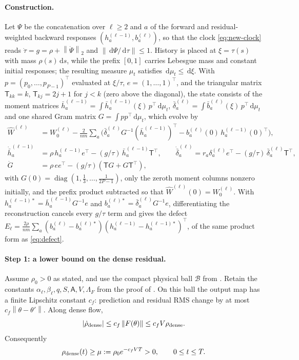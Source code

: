 \documentclass[11pt]{article}
\theoremstyle{definition}
\theoremstyle{remark}
\newcommand{\norm}[1]{\left\lVert #1\right\rVert}
\newcommand{\dd}{\,\mathrm{d}}
\newcommand{\diag}{\operatorname{diag}}
\begin{document}
\paragraph{Construction.}
Let $\Psi$ be the concatenation over $\ell\ge2$ and $a$ of the forward and
residual-weighted backward responses $(h^{(\ell-1)}_a,b^{(\ell)}_a)$, so that the
clock \eqref{eq:new-clock} reads $\dot\tau=g=\rho+\norm{\dot\Psi}_2$ and
$\norm{\dd\Psi/\dd\tau}\le1$.  History is placed at $\xi=\tau(s)$ with mass
$\rho(s)\dd s$, while the prefix $[0,1]$ carries Lebesgue mass and constant
initial responses; the resulting measure $\mu_t$ satisfies $\dd\mu_t\le\dd\xi$.
With $p=(p_0,\ldots,p_{P-1})^\top$ evaluated at $\xi/\tau$, $e=(1,\ldots,1)^\top$,
and the triangular matrix $\mathsf T_{kk}=k$, $\mathsf T_{kj}=2j+1$ for $j<k$
(zero above the diagonal), the state consists of the moment matrices
$\bar h^{(\ell-1)}_a=\int\bar h^{(\ell-1)}_a(\xi)\,p^\top\dd\mu_t$,
$\bar\delta^{(\ell)}_a=\int\bar b^{(\ell)}_a(\xi)\,p^\top\dd\mu_t$ and one shared
Gram matrix $G=\int pp^\top\dd\mu_t$, which evolve by
\begin{align}
 \widehat W^{(\ell)}&=W_0^{(\ell)}-\frac{2}{nm}\sum_a
 \bigl(\bar\delta^{(\ell)}_aG^{-1}(\bar h^{(\ell-1)}_a)^\top
 -b^{(\ell)}_a(0)\,h^{(\ell-1)}_a(0)^\top\bigr),\nonumber\\
 \dot{\bar h}^{(\ell-1)}_a&=\rho\,h^{(\ell-1)}_ae^\top-(g/\tau)\,\bar h^{(\ell-1)}_a\mathsf T^\top,
 \qquad
 \dot{\bar\delta}^{(\ell)}_a=r_a\delta_a^{(\ell)}e^\top-(g/\tau)\,\bar\delta^{(\ell)}_a\mathsf T^\top,
 \nonumber\\
 \dot G&=\rho\,ee^\top-(g/\tau)(\mathsf TG+G\mathsf T^\top),     \label{eq:new-ode}
\end{align}
with $G(0)=\diag(1,\tfrac13,\ldots,\tfrac1{2P-1})$, only the zeroth moment
columns nonzero initially, and the prefix product subtracted so that
$\widehat W^{(\ell)}(0)=W_0^{(\ell)}$.  With $h^{(\ell-1)*}_a=\bar h^{(\ell-1)}_aG^{-1}e$
and $b^{(\ell)*}_a=\bar\delta^{(\ell)}_aG^{-1}e$, differentiating the
reconstruction cancels every $g/\tau$ term and gives the defect
$E_\ell=\frac{2\rho}{nm}\sum_a(b^{(\ell)}_a-b^{(\ell)*}_a)(h^{(\ell-1)}_a-h^{(\ell-1)*}_a)^\top$,
of the same product form as \eqref{eq:defect}.

\paragraph{Step 1: a lower bound on the dense residual.}
Assume $\rho_0>0$ as stated, and use the compact physical ball $\mathcal B$ from
.  Retain the constants
$\alpha_\ell,\beta_\ell,q,S,\mathsf A,V,\Lambda_F$ from the proof of .  On
this ball the output map has a finite Lipschitz constant $c_f$: prediction and
residual RMS change by at most $c_f\norm{\theta-\theta'}$.  Along dense flow,
\[
 |\dot\rho_{\rm dense}|\le c_f\norm{F(\theta)}
 \le c_fV\rho_{\rm dense}.
\]
Consequently
\begin{equation}
 \rho_{\rm dense}(t)\ge
 \mu:=\rho_0e^{-c_fVT}>0,\qquad 0\le t\le T.          \label{eq:dense-rho-lower}
\end{equation}
\end{document}
